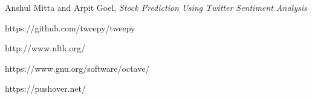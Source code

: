 \documentclass[12pt,journal,compsoc]{IEEEtran}
\begin{document}
\begin{thebibliography}{1}

Anshul Mitta and Arpit Goel, \textit{Stock Prediction Using Twitter Sentiment Analysis}

https://github.com/tweepy/tweepy

http://www.nltk.org/

https://www.gnu.org/software/octave/

https://pushover.net/

\end{thebibliography}
\end{document}
